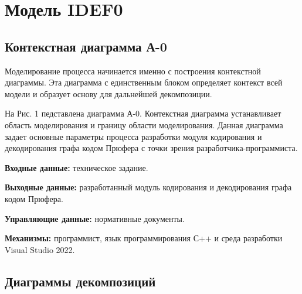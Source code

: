 \documentclass[a4paper, final]{article}
\begin{document}



\newpage
\section{Модель IDEF0}


\subsection{Контекстная диаграмма А-0}

Моделирование процесса начинается именно с построения контекстной диаграммы. Эта диаграмма с единственным блоком определяет
контекст всей модели и образует основу для дальнейшей декомпозиции. 
\par На Рис. 1 педставлена диаграмма А-0. Контекстная диаграмма устанавливает область моделирования и границу 
области моделирования. Данная диаграмма задает основные параметры процесса разработки модуля кодирования и декодирования графа
кодом Прюфера с точки зрения разработчика-программиста. 

\par {\bf Входные данные:} техническое задание.

\par {\bf Выходные данные:} разработанный модуль кодирования и декодирования графа кодом Прюфера.

\par {\bf Управляющие данные:} нормативные документы.

\par {\bf Механизмы:} программист, язык программирования С++ и среда разработки Visual Studio 2022. 

\newpage
\hypertarget{img:A-0}{}



\subsection{Диаграммы декомпозиций}
\end{document}
